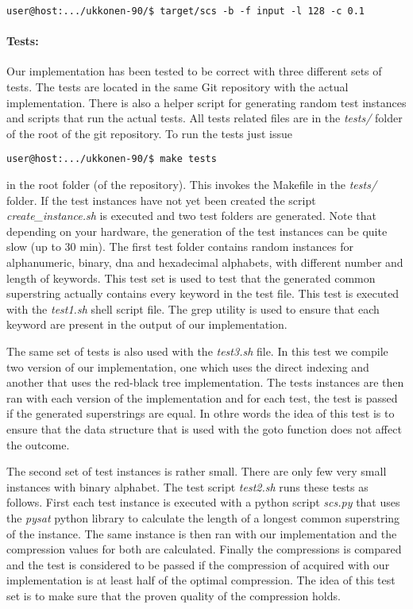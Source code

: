\documentclass[english,twoside,censored,csm,algorithms-track-2020]{HYthesisML}
\theoremstyle{plain}
\theoremstyle{definition}
\begin{document}
\begin{verbatim}
user@host:.../ukkonen-90/$ target/scs -b -f input -l 128 -c 0.1
\end{verbatim}

\paragraph{Tests:}
Our implementation has been tested to be correct with three different sets of tests. The tests are
located in the same Git repository with the actual implementation. There is also a helper script for
generating random test instances and scripts that run the actual tests.
All tests related files are in the \textit{tests/} folder of the
root of the git repository. To run the tests just issue

\begin{verbatim}
user@host:.../ukkonen-90/$ make tests
\end{verbatim}

in the root folder (of the repository). This invokes the Makefile in the \textit{tests/} folder. If the
test instances have not yet been created the script \textit{create\_instance.sh} is executed and two
test folders are generated. Note that depending on your hardware, the generation of the test instances can be quite slow (up to 30 min).
The first test folder contains random instances for alphanumeric, binary,
dna and hexadecimal alphabets, with different number and length of keywords. This test set is used
to test that the generated common superstring actually contains every keyword in the test file. This
test is executed with the \textit{test1.sh} shell script file. The grep utility is used to ensure
that each keyword are present in the output of our implementation. 

The same set of tests is also used with the \textit{test3.sh} file. In this test we compile two version
of our implementation, one which uses the direct indexing and another that uses the red-black tree
implementation. The tests instances are then ran with each version of the implementation and for each
test, the test is passed if the generated superstrings are equal. In othre words the idea of this
test is to ensure that the data structure that is used with the goto function does not affect
the outcome.

The second set of test instances is rather small. There are only few very small instances with binary
alphabet. The test script \textit{test2.sh} runs these tests as follows. First each test instance is
executed with a python script \textit{scs.py} that uses the \textit{pysat} python library to calculate
the length of a longest common superstring of the instance. The same instance is then ran with our
implementation and the compression values for both are calculated. Finally the compressions is compared
and the test is considered to be passed if the compression of acquired with our implementation is
at least half of the optimal compression. The idea of this test set is to make sure that the proven
quality of the compression holds.
\end{document}

